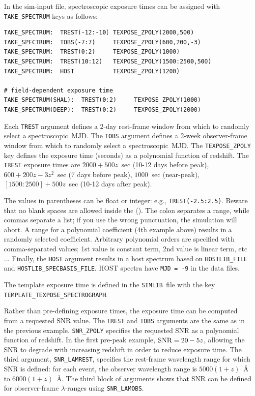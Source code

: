 \documentclass[12pt]{article}
\newcommand{\simlib}{{\tt SIMLIB}}
\newcommand{\spec}{spectroscopic}
\begin{document}
In the sim-input file, spectroscopic exposure times 
can be assigned with {\tt TAKE\_SPECTRUM} keys as follows:
%
\begin{Verbatim}[frame=single]
TAKE_SPECTRUM:  TREST(-12:-10) TEXPOSE_ZPOLY(2000,500)
TAKE_SPECTRUM:  TOBS(-7:7)     TEXPOSE_ZPOLY(600,200,-3)
TAKE_SPECTRUM:  TREST(0:2)     TEXPOSE_ZPOLY(1000) 
TAKE_SPECTRUM:  TREST(10:12)   TEXPOSE_ZPOLY(1500:2500,500)
TAKE_SPECTRUM:  HOST           TEXPOSE_ZPOLY(1200) 

# field-dependent exposure time
TAKE_SPECTRUM(SHAL):  TREST(0:2)     TEXPOSE_ZPOLY(1000) 
TAKE_SPECTRUM(DEEP):  TREST(0:2)     TEXPOSE_ZPOLY(2000) 
\end{Verbatim}
%
Each {\tt TREST} argument defines a 2-day rest-frame window from 
which to randomly select a \spec\ MJD.
The {\tt TOBS} argument defines a 2-week observer-frame window 
from which to randomly select a \spec\ MJD.
The {\tt TEXPOSE\_ZPOLY} key defines the exposure time (seconds) 
as a polynomial function of redshift. 
The {\tt TREST} exposure times are 
$2000+500z$~sec (10-12 days before peak),
$600+200z-3z^2$~sec ($7$ days before peak),
$1000$~sec (near-peak),
$[1500:2500]+500z$~sec (10-12 days after peak).

The values in parentheses can be float or integer: 
e.g., {\tt TREST(-2.5:2.5)}. Beware that no blank
spaces are allowed inside the (). The colon separates
a range, while commas separate a list; if you use the
wrong punctuation, the simulation will abort.
A range for a polynomial coefficient (4th example above)
results in a randomly selected coefficient. 
Arbitrary polynomial orders are specified with comma-separated values;
1st value is constant term, 2nd value is linear term, etc ...
Finally, the {\tt HOST} argument results in a host spectrum
based on {\tt HOSTLIB\_FILE} and {\tt HOSTLIB\_SPECBASIS\_FILE}.
HOST spectra have {\tt MJD = -9} in the data files.


The template exposure time is defined in the \simlib\ file
with the key \\ {\tt TEMPLATE\_TEXPOSE\_SPECTROGRAPH}.

\medskip
\noindent Rather than pre-defining exposure times, the exposure
time can be computed from a requested SNR value.
The {\tt TREST} and {\tt TOBS} arguments are the same as in 
the previous example.
{\tt SNR\_ZPOLY} specifies the requested SNR as a 
polynomial function of redshift. In the first pre-peak
example, ${\rm SNR} = 20-5z$, allowing the SNR to degrade
with increasing redshift in order to reduce exposure time.
The third argument, {\tt SNR\_LAMREST}, specifies the
rest-frame wavelength range for which SNR is defined:
for each event, the observer wavelength range is
$5000(1+z)$~{\AA} to $6000(1+z)$~{\AA}.
The third block of arguments shows that SNR can be
defined for observer-frame $\lambda$-ranges using
{\tt SNR\_LAMOBS}.
\end{document}
